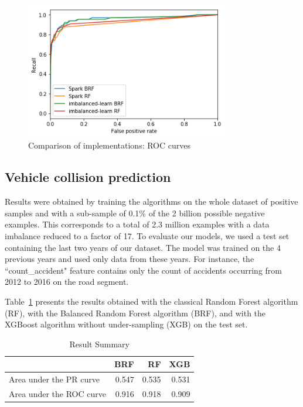 \documentclass[conference]{IEEEtran}
\begin{document}
\begin{figure}[htbp]
\centerline{\includegraphics[height=6cm, keepaspectratio]{Figures/test_brf_roc.png}}
\caption{Comparison of implementations: ROC curves}
\label{fig:test-brf-roc}
\end{figure}

\subsection{Vehicle collision prediction}

Results were obtained by training the algorithms on the whole
dataset of positive samples and with a sub-sample of 0.1\% of the 2
billion possible negative examples. This corresponds to a total of 2.3
million examples with a data imbalance reduced to a factor of 17. To
evaluate our models, we used a test set containing the last two years of our
dataset. The model was trained on the 4 previous years and used only data
from these years. For instance, the ``count\_accident" feature contains only
the count of accidents occurring from 2012 to 2016 on the road segment.

Table~\ref{table:summary} presents the results obtained with the classical
Random Forest algorithm (RF), with the Balanced Random Forest algorithm (BRF), and with the XGBoost algorithm without under-sampling (XGB) on the test set.

\begin{table}[htbp]
\caption{Result Summary}
\begin{center}
\begin{tabular}{|l|r|r|r|}
\cline{2-4}
\multicolumn{1}{c|}{} &    BRF &    RF &    XGB \\
\hline
Area under the PR curve &  0.547 &  0.535 &  0.531 \\
Area under the ROC curve &  0.916 &  0.918 &  0.909 \\
\hline
\end{tabular}
\label{table:summary}
\end{center}
\end{table}
\end{document}
